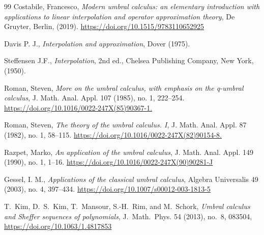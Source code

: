\begin{thebibliography}{99}
Costabile, Francesco, \textit{Modern umbral calculus: an elementary introduction with applications to linear interpolation and operator approximation theory}, De Gruyter, Berlin, (2019).
\url{https://doi.org/10.1515/9783110652925} 

Davis P. J., \textit{Interpolation and approximation}, Dover (1975).

Steffensen J.F., \textit{Interpolation}, 2nd ed., Chelsea Publishing Company, New York, (1950).

Roman, Steven,
\textit{ More on the umbral calculus, with emphasis on the q-umbral calculus}, J. Math. Anal. Appl. 107 (1985), no. 1, 222–254.
\url{https://doi.org/10.1016/0022-247X(85)90367-1.}

Roman, Steven, \textit{The theory of the umbral calculus. I}, 
J. Math. Anal. Appl. 87 (1982), no. 1, 58–115.
\url{https://doi.org/10.1016/0022-247X(82)90154-8.}

Razpet, Marko, \textit{An application of the umbral calculus}, 
J. Math. Anal. Appl. 149 (1990), no. 1, 1–16.
\url{https://doi.org/10.1016/0022-247X(90)90281-J}

Gessel, I. M., \textit{Applications of the classical umbral calculus}, Algebra Universalis 49 (2003), no. 4, 397–434.
\url{https://doi.org/10.1007/s00012-003-1813-5}

T. Kim, D. S. Kim, T. Mansour, S.-H. Rim, and M. Schork, \textit{Umbral calculus and Sheffer sequences of polynomials}, 
J. Math. Phys. 54 (2013), no. 8, 083504, 
\url{https://doi.org/10.1063/1.4817853}

\end{thebibliography}